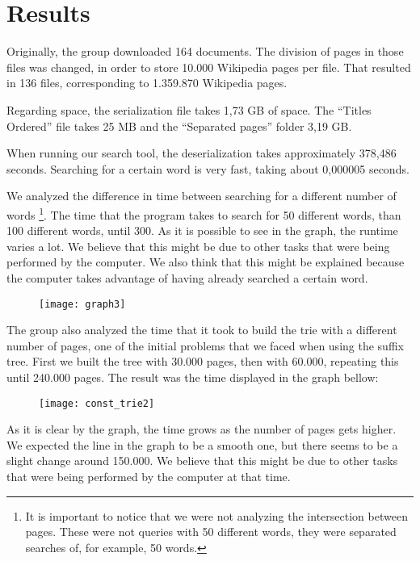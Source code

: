 \documentclass{article}
\begin{document}

\section*{Results}
Originally, the group downloaded 164 documents. The division of pages in those files was changed, in order to store 10.000 Wikipedia pages per file. That resulted in 136 files, corresponding to 1.359.870 Wikipedia pages. 

Regarding space, the serialization file takes 1,73 GB of space. The ``Titles Ordered'' file takes 25 MB and the ``Separated pages'' folder 3,19 GB. 

When running our search tool, the deserialization takes approximately 378,486 seconds. Searching for a certain word is very fast, taking about 0,000005 seconds. 

We analyzed the difference in time between searching for a different number of words \footnote{It is important to notice that we were not analyzing the intersection between pages. These were not queries with 50 different words, they were separated searches of, for example, 50 words.}. The time that the program takes to search for 50 different words, than 100 different words, until 300. As it is possible to see in the graph, the runtime varies a lot. We believe that this might be due to other tasks that were being performed by the computer. We also think that this might be explained because the computer takes advantage of having already searched a certain word. 

\begin{figure}[H]
 \centering
  \texttt{[image: graph3]}
 \end{figure}
 

The group also analyzed the time that it took to build the trie with a different number of pages, one of the initial problems that we faced when using the suffix tree. First we built the tree with 30.000 pages, then with 60.000, repeating this until 240.000 pages. The result was the time displayed in the graph bellow:

\begin{figure}[H]
 \centering
  \texttt{[image: const\_trie2]}
 \end{figure}

 
 As it is clear by the graph, the time grows as the number of pages gets higher. We expected the line in the graph to be a smooth one, but there seems to be a slight change around 150.000. We believe that this might be due to other tasks that were being performed by the computer at that time. 
\end{document}
